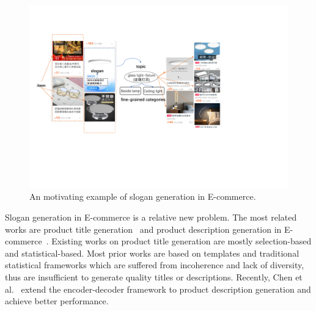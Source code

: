 

\begin{figure}[th!]
	\centering
	\includegraphics[width=0.95\columnwidth]{figures/example}
	\caption{An motivating example of slogan generation in E-commerce. }
\label{fig:example}
\end{figure}


Slogan generation in E-commerce is a relative new problem.
The most related works are product title generation~\cite{suzuki2011automatic,mathur2017generating,de2018generating}
and product description generation in E-commerce~\cite{langkilde1998generation,wang2017statistical}.
Existing works on product title generation are mostly 
selection-based and statistical-based.
Most prior works are based on templates and traditional statistical frameworks which are suffered from incoherence and lack of diversity,
thus are insufficient to generate quality titles or descriptions.
Recently, Chen et al.~\cite{ChenLZYZ019} extend the encoder-decoder framework to product description generation and achieve better performance. 


